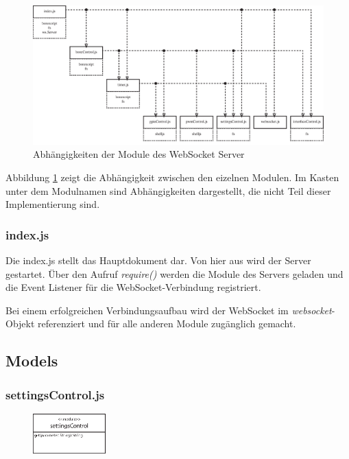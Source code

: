 \begin{figure}[ht]
  \centering
  \includegraphics[width = \textwidth]{documentation/images/wssDependencies.eps}
  \caption{Abhängigkeiten der Module des WebSocket Server}
  \label{fig:wssDependencies}
\end{figure}

Abbildung \ref{fig:wssDependencies} zeigt die Abhängigkeit zwischen den eizelnen Modulen. Im Kasten unter dem Modulnamen sind Abhängigkeiten dargestellt, die nicht Teil dieser Implementierung sind.


\subsubsection{index.js}
Die index.js stellt das Hauptdokument dar. Von hier aus wird der Server gestartet. Über den Aufruf \textit{require()} werden die Module des Servers geladen und die Event Listener für die WebSocket-Verbindung registriert.

Bei einem erfolgreichen Verbindungsaufbau wird der WebSocket im \textit{websocket}-Objekt referenziert und für alle anderen Module zugänglich gemacht.


\subsection{Models}

\subsubsection{settingsControl.js}
\begin{figure}
  \vspace{-18pt}
  \centering
  \includegraphics[width = 0.25\textwidth]{documentation/images/apiSettingsControl.eps}
\end{figure}

